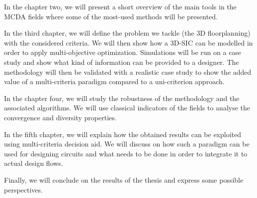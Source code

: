 In the chapter two, we will present a short overview of the main tools in the MCDA fields where some of the most-used methods will be presented.

In the third chapter, we will define the problem we tackle (the 3D floorplanning) with the considered criteria. We will then show how a 3D-SIC can be modelled in order to apply multi-objective optimization. Simulations will be run on a case study and show what kind of information can be provided to a designer. The methodology will then be validated with a realistic case study to show the added value of a multi-criteria paradigm compared to a uni-criterion approach.

In the chapter four, we will study the robustness of the methodology and the associated algorithms. We will use classical indicators of the fields to analyse the convergence and diversity properties.

In the fifth chapter, we will explain how the obtained results can be exploited using multi-criteria decision aid. We will discuss on how such a paradigm can be used for designing circuits and what needs to be done in order to integrate it to actual design flows.

Finally, we will conclude on the results of the thesis and express some possible perspectives.

